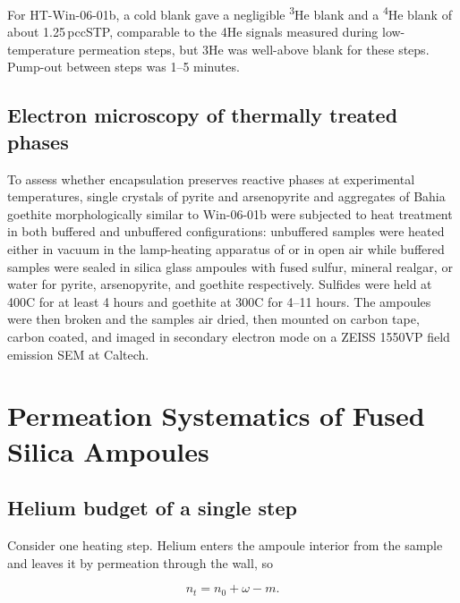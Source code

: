 For HT-Win-06-01b, a cold blank gave a negligible \textsuperscript{3}He blank and a \textsuperscript{4}He blank of about 1.25\,pccSTP, comparable to the 4He signals measured during low-temperature permeation steps, but 3He was well-above blank for these steps. Pump-out between steps was 1--5 minutes.

\subsection{Electron microscopy of thermally treated phases}\label{sec:methods-sem}

To assess whether encapsulation preserves reactive phases at experimental temperatures, single crystals of pyrite and arsenopyrite and aggregates of Bahia goethite morphologically similar to Win-06-01b \citep{shustervasconcelos2005,monteiro2017} were subjected to heat treatment in both buffered and unbuffered configurations: unbuffered samples were heated either in vacuum in the lamp-heating apparatus of \citet{farley1999} or in open air while buffered samples were sealed in silica glass ampoules with fused sulfur, mineral realgar, or water for pyrite, arsenopyrite, and goethite respectively. Sulfides were held at 400\textdegree C for at least 4 hours and goethite at 300\textdegree C for 4--11 hours. The ampoules were then broken and the samples air dried, then mounted on carbon tape, carbon coated, and imaged in secondary electron mode on a ZEISS 1550VP field emission SEM at Caltech.

\section{Permeation Systematics of Fused Silica Ampoules}\label{sec:theory}

\subsection{Helium budget of a single step}\label{sec:budget}

Consider one heating step. Helium enters the ampoule interior from the sample and leaves it by permeation through the wall, so

\begin{equation}
\label{eq:permlag}
n_{t} = n_{0} + \omega - m .
\end{equation}

